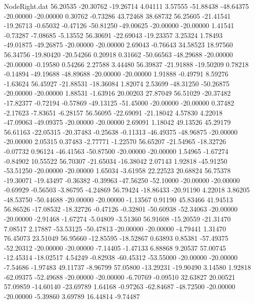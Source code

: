 \begin{filecontents}{NodeRight.dat}
  56.20535  -20.30762  -19.26714     4.04111    3.57555  -51.88438  -48.64375  -20.00000  -20.00000    0.30762   -0.73286   43.72468   38.68732
  56.25605  -21.41541  -19.26713    -0.65032   -0.47126  -50.81250  -49.00625  -20.00000  -20.00000    1.41541   -0.73287   -7.08685   -5.13552
  56.30691  -22.69043  -19.23357     3.25324    1.78493  -49.01875  -49.26875  -20.00000  -20.00000    2.69043   -0.76643   34.58523   18.97560
  56.34756  -19.80420  -20.54266     0.20918    0.31662  -50.66563  -48.29688  -20.00000  -20.00000   -0.19580    0.54266    2.27588    3.44480
  56.39837  -21.91888  -19.50209     0.78218   -0.14894  -49.19688  -48.89688  -20.00000  -20.00000    1.91888   -0.49791    8.59276   -1.63624
  56.45927  -21.88531  -18.36084     1.82074    2.53699  -48.31250  -50.26875  -20.00000  -20.00000    1.88531   -1.63916   20.00203   27.87049
  56.51029  -20.37482  -17.82377    -0.72194   -0.57869  -49.13125  -51.45000  -20.00000  -20.00000    0.37482   -2.17623   -7.83651   -6.28157
  56.56095  -22.69091  -21.18042     4.57830    4.22018  -47.09063  -49.09375  -20.00000  -20.00000    2.69091    1.18042   49.13526   45.29179
  56.61163  -22.05315  -20.37483    -0.25638   -0.11313  -46.49375  -48.96875  -20.00000  -20.00000    2.05315    0.37483   -2.77771   -1.22570
  56.65207  -21.54965  -18.32726    -0.07732    0.96124  -46.41563  -50.87500  -20.00000  -20.00000    1.54965   -1.67274   -0.84902   10.55522
  56.70307  -21.65034  -16.38042     2.07143    1.92818  -45.91250  -53.51250  -20.00000  -20.00000    1.65034   -3.61958   22.22523   20.68824
  56.75378  -19.30071  -19.43497    -0.36382   -0.39963  -47.56250  -52.10000  -20.00000  -20.00000   -0.69929   -0.56503   -3.86795   -4.24869
  56.79424  -18.86433  -20.91190     4.22018    3.86205  -48.53750  -50.44688  -20.00000  -20.00000   -1.13567    0.91190   45.83466   41.94513
  56.86526  -17.08532  -18.32726    -0.47126   -0.32801  -50.60938  -52.34063  -20.00000  -20.00000   -2.91468   -1.67274   -5.04809   -3.51360
  56.91608  -15.20559  -21.31470     7.08517    2.17887  -53.53125  -50.47813  -20.00000  -20.00000   -4.79441    1.31470   76.45073   23.51049
  56.95660  -12.85595  -18.52867     0.63893    0.85381  -57.49375  -52.20312  -20.00000  -20.00000   -7.14405   -1.47133    6.88868    9.20537
  57.00745  -12.45314  -18.02517     4.54249   -0.82938  -60.45312  -53.55000  -20.00000  -20.00000   -7.54686   -1.97483   49.11737   -8.96799
  57.05800  -13.29231  -19.90490     3.14580    1.92818  -62.09375  -52.49688  -20.00000  -20.00000   -6.70769   -0.09510   32.63827   20.00521
  57.09859  -14.60140  -23.69789     1.64168   -0.97263  -62.84687  -48.72500  -20.00000  -20.00000   -5.39860    3.69789   16.44814   -9.74487

\end{filecontents}
